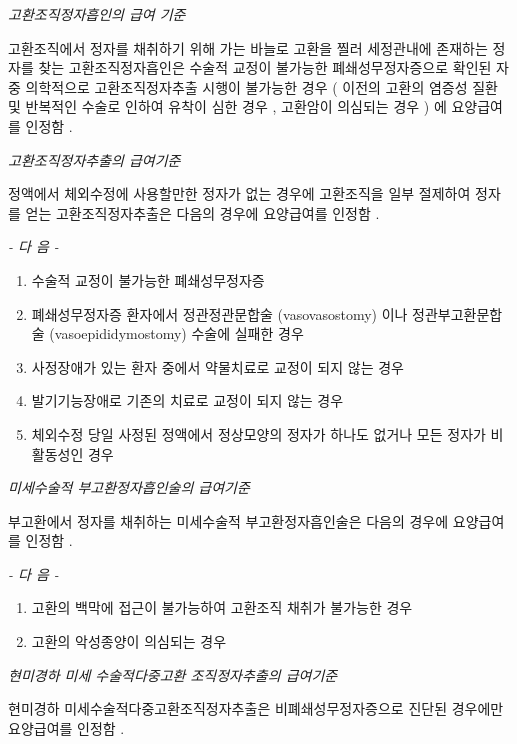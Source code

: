 \emph{고환조직정자흡인의 급여 기준}\par 
고환조직에서 정자를 채취하기 위해 가는 바늘로 고환을 찔러  세정관내에 존재하는 정자를 찾는 고환조직정자흡인은 수술적  교정이 불가능한 폐쇄성무정자증으로 확인된 자 중 의학적으로  고환조직정자추출 시행이 불가능한 경우 ( 이전의  고환의 염증성  질환 및 반복적인 수술로 인하여 유착이 심한 경우 ,  고환암이 의심되는 경우 ) 에 요양급여를 인정함 . \par
 

\emph{고환조직정자추출의 급여기준}\par 
정액에서 체외수정에 사용할만한 정자가 없는 경우에 고환조직을  일부 절제하여 정자를 얻는 고환조직정자추출은 다음의 경우에 요양급여를 인정함 . \par

\emph{-  다 음  -}\par 
\begin{enumerate}[가.]\tightlist
\item 수술적 교정이 불가능한 폐쇄성무정자증 
\item 폐쇄성무정자증 환자에서 정관정관문합술 (vasovasostomy) 이나 정관부고환문합술 (vasoepididymostomy)  수술에 실패한  경우 
\item 사정장애가 있는 환자 중에서 약물치료로 교정이 되지 않는  경우 
\item 발기기능장애로 기존의 치료로 교정이 되지 않는 경우 
\item 체외수정 당일 사정된 정액에서 정상모양의 정자가 하나도  없거나 모든 정자가  비활동성인  경우 
\end{enumerate} 

\emph{미세수술적 부고환정자흡인술의 급여기준}\par 
부고환에서 정자를 채취하는 미세수술적 부고환정자흡인술은 다음의 경우에 요양급여를 인정함 . \par

\emph{-  다 음  -}\par 
\begin{enumerate}[가.]\tightlist
\item 고환의 백막에 접근이 불가능하여 고환조직 채취가 불가능한 경우 
\item 고환의 악성종양이 의심되는 경우 
\end{enumerate} 

\emph{현미경하 미세 수술적다중고환 조직정자추출의 급여기준}\par 
현미경하 미세수술적다중고환조직정자추출은 비폐쇄성무정자증으로 진단된 경우에만 요양급여를 인정함 . \par

